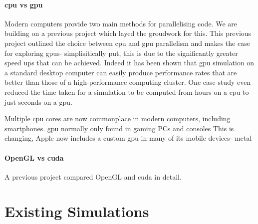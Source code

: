 \documentclass{UoYCSproject}
\begin{document}
\paragraph{\acrshort{cpu} vs \acrshort{gpu}}
Modern computers provide two main methods for parallelising code.
We are building on a previous project\cite{phil_diss} which layed the groudwork for this.
This previous project outlined the choice between \acrshort{cpu} and \acrshort{gpu} parallelism and makes the case for exploring \acrshort{gpu}s- simplisitically put, this is due to the significantly greater speed ups that can be achieved.
Indeed it has been shown that \acrshort{gpu} simulation on a standard desktop computer can easily produce performance rates that are better than those of a high-performance computing cluster\cite{flame_simulation}.
One case study even reduced the time taken for a simulation to be computed from hours on a \acrshort{cpu} to just seconds on a \acrshort{gpu}\cite{flame_keratinocyte}.

Multiple \acrshort{cpu} cores are now commonplace in modern computers, including smartphones.
\acrshort{gpu} normally only found in gaming PCs and consoles
This is changing, Apple now includes a custom \acrshort{gpu} in many of its mobile devices- metal



\paragraph{OpenGL vs \acrshort{cuda}}
A previous project compared OpenGL and \acrshort{cuda} in detail.


\section{Existing Simulations}
\end{document}
